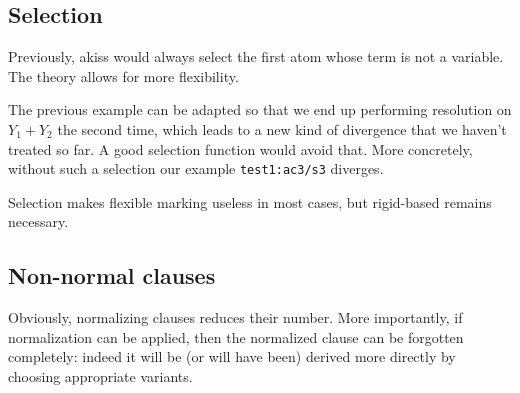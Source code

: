 \documentclass{article}
\begin{document}
\subsection{Selection}

Previously, akiss would always select the first atom whose term
is not a variable. The theory allows for more flexibility.

The previous example can be adapted so that we end up performing
resolution on $Y_1+Y_2$ the second time, which leads to a new kind of
divergence that we haven't treated so far. A good selection function
would avoid that.
More concretely, without such a selection our example \verb$test1:ac3/s3$ diverges.

Selection makes flexible marking useless
in most cases, but rigid-based remains necessary.

\subsection{Non-normal clauses}

Obviously, normalizing clauses reduces their number.
More importantly, if normalization can be applied, then
the normalized clause can be forgotten completely: indeed it will be (or will 
have been) derived more directly by choosing appropriate variants.
\end{document}
